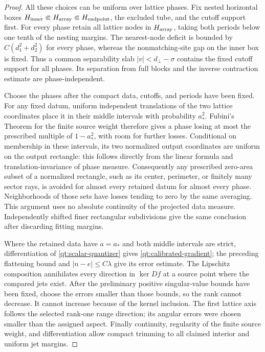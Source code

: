 \begin{proof}
All these choices can be uniform over lattice phases.  Fix nested
horizontal boxes
$H_{\rm inner}\Subset H_{\rm array}\Subset H_{\rm endpoint}$,
the excluded tube, and the cutoff support first.  For every phase
retain all lattice nodes in $H_{\rm array}$, taking both periods below
one tenth of the nesting margins.  The nearest-node deficit is bounded
by $C(d_1^2+d_2^2)$ for every phase, whereas the nonmatching-site gap
on the inner box is fixed.  Thus a common separability slab
$|v|<d_\perp-\sigma$ contains the fixed cutoff support for all phases.
Its separation from full blocks and the inverse contraction estimate
are phase-independent.

Choose the phases after the compact data, cutoffs, and periods have
been fixed.  For any fixed datum, uniform independent translations of
the two lattice coordinates place it in their middle intervals with
probability $a_*^2$.  Fubini's Theorem for the finite source weight
therefore gives a phase losing at most the prescribed multiple of
$1-a_*^2$, with room for further losses.  Conditional on membership
in these intervals, its two normalized output coordinates are uniform
on the output rectangle: this follows directly from the linear
formula and translation-invariance of phase measure.  Consequently
any prescribed zero-area subset of a normalized rectangle, such as
its center, perimeter, or finitely many sector rays, is avoided for
almost every retained datum for almost every phase.  Neighborhoods
of those sets have losses tending to zero by the same averaging.
This argument uses no absolute continuity of the projected data
measure.  Independently shifted finer rectangular subdivisions give
the same conclusion after discarding fitting margins.

Where the retained data have $a=a_*$ and both middle intervals are
strict, differentiation of \eqref{qt:scalar-quantizer} gives
\eqref{qt:calibrated-gradient}; the preceding flattening bound and
$|n-e|\leq C\lambda$ give its error estimate.  The Lipschitz
composition annihilates every direction in $\ker Df$ at a source
point where the compared jets exist.  After the preliminary positive
singular-value bounds have been fixed, choose the errors smaller than
those bounds, so the rank cannot decrease.  It cannot increase because
of the kernel inclusion.  The first lattice axis follows the selected
rank-one range direction; its angular errors were chosen smaller than
the assigned aspect.  Finally continuity, regularity of the finite
source weight, and differentiation allow compact trimming to all
claimed interior and uniform jet margins.
\end{proof}


